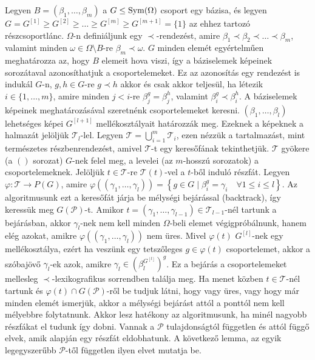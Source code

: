 Legyen $B=(\beta_1,\dots,\beta_m)$ a $G \le \operatorname{Sym}(\Omega)$ csoport egy bázisa, és legyen $G = G^{[1]} \ge G^{[2]} \ge \dots \ge G^{[m]} \ge G^{[m+1]} = \{1\}$ az ehhez tartozó részcsoportlánc.
$\Omega$-n definiáljunk egy $\prec$-rendezést, amire $\beta_1 \prec \beta_2 \prec \dots \prec \beta_m$, valamint minden $\omega \in \Omega \setminus B$-re $\beta_m \prec \omega$.
$G$ minden elemét egyértelműen meghatározza az, hogy $B$ elemeit hova viszi, így a báziselemek képeinek sorozátaval azonosíthatjuk a csoportelemeket.
Ez az azonosítás egy rendezést is indukál $G$-n, $g, h \in G$-re $g \prec h$ akkor és csak akkor teljesül, ha létezik $i \in \{1,\dots,m\}$, amire minden $j < i$-re $\beta_j^g = \beta_j^h$, valamint $\beta_i^g \prec \beta_i^h$.
A báziselemek képeinek meghatározásával szeretnénk csoportelemeket keresni.
$(\beta_1,\dots,\beta_l)$ lehetséges képei $G^{[l+1]}$ mellékosztályait határozzák meg.
Ezeknek a képeknek a halmazát jelöljük $\mathcal{T}_l$-lel.
Legyen $\mathcal{T} = \bigcup_{i=1}^m \mathcal{T}_i$, ezen nézzük a tartalmazást, mint természetes részbenrendezést, amivel $\mathcal{T}$-t egy keresőfának tekinthetjük.
$\mathcal{T}$ gyökere (a $()$ sorozat) $G$-nek felel meg, a levelei (az $m$-hosszú sorozatok) a csoportelemeknek.
Jelöljük $t \in \mathcal{T}$-re $\mathcal{T}(t)$-vel a $t$-ből induló részfát.
Legyen $\varphi : \mathcal{T} \to P(G)$, amire $\varphi((\gamma_1,\dots,\gamma_l)) = \left\{ g \in G \mid \beta_i^g = \gamma_i \quad \forall 1 \le i \le l \right \}$.
Az algoritmusunk ezt a keresőfát járja be mélységi bejárással (backtrack), így keressük meg $G(\mathcal{P})$-t.
Amikor $t = (\gamma_1,\dots,\gamma_{l-1}) \in \mathcal{T}_{l-1}$-nél tartunk a bejárásban, akkor $\gamma_l$-nek nem kell minden $\Omega$-beli elemet végigpróbálnunk,
hanem elég azokat, amikre $\varphi((\gamma_1,\dots,\gamma_l))$ nem üres.
Mivel $\varphi(t)$ $G^{[l]}$-nek egy mellékosztálya, ezért ha veszünk egy tetszőleges $g \in \varphi(t)$ csoportelemet, akkor a szóbajövő $\gamma_l$-ek
azok, amikre $\gamma_l \in (\beta_l^{G^{[l]}})^g$.
Ez a bejárás a csoportelemeket mellesleg $\prec$-lexikografikus sorrendben találja meg.
Ha menet közben $t \in \mathcal{T}$-nél tartunk és $\varphi(t) \cap G(\mathcal{P})$-ről be tudjuk látni, hogy vagy üres, vagy hogy már minden elemét ismerjük, akkor a mélységi bejárást attól a ponttól nem kell mélyebbre folytatnunk.
Akkor lesz hatékony az algoritmusunk, ha minél nagyobb részfákat el tudunk így dobni.
Vannak a $\mathcal{P}$ tulajdonságtól független és attól függő elvek, amik alapján egy részfát eldobhatunk.
A következő lemma, az egyik legegyszerűbb $\mathcal{P}$-től független ilyen elvet mutatja be.
